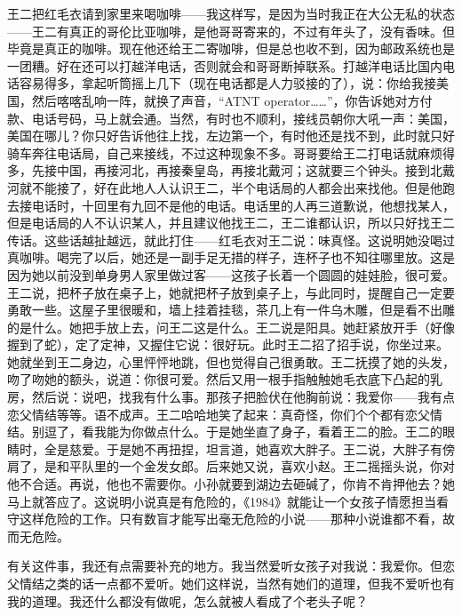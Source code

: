 王二把红毛衣请到家里来喝咖啡——我这样写，是因为当时我正在大公无私的状态——王二有真正的哥伦比亚咖啡，是他哥哥寄来的，不过有年头了，没有香味。但毕竟是真正的咖啡。现在他还给王二寄咖啡，但是总也收不到，因为邮政系统也是一团糟。好在还可以打越洋电话，否则就会和哥哥断掉联系。打越洋电话比国内电话容易得多，拿起听筒摇上几下（现在电话都是人力驳接的了），说：你给我接美国，然后喀喀乱响一阵，就换了声音，“ATNT operator……”，你告诉她对方付款、电话号码，马上就会通。当然，有时也不顺利，接线员朝你大吼一声：美国，美国在哪儿？你只好告诉他往上找，左边第一个，有时他还是找不到，此时就只好骑车奔往电话局，自己来接线，不过这种现象不多。哥哥要给王二打电话就麻烦得多，先接中国，再接河北，再接秦皇岛，再接北戴河；这就要三个钟头。接到北戴河就不能接了，好在此地人人认识王二，半个电话局的人都会出来找他。但是他跑去接电话时，十回里有九回不是他的电话。电话里的人再三道歉说，他想找某人，但是电话局的人不认识某人，并且建议他找王二，王二谁都认识，所以只好找王二传话。这些话越扯越远，就此打住——红毛衣对王二说：味真怪。这说明她没喝过真咖啡。喝完了以后，她还是一副手足无措的样子，连杯子也不知往哪里放。这是因为她以前没到单身男人家里做过客——这孩子长着一个圆圆的娃娃脸，很可爱。王二说，把杯子放在桌子上，她就把杯子放到桌子上，与此同时，提醒自己一定要勇敢一些。这屋子里很暖和，墙上挂着挂毯，茶几上有一件乌木雕，但是看不出雕的是什么。她把手放上去，问王二这是什么。王二说是阳具。她赶紧放开手（好像握到了蛇），定了定神，又握住它说：很好玩。此时王二招了招手说，你坐过来。她就坐到王二身边，心里怦怦地跳，但也觉得自己很勇敢。王二抚摸了她的头发，吻了吻她的额头，说道：你很可爱。然后又用一根手指触触她毛衣底下凸起的乳房，然后说：说吧，找我有什么事。那孩子把脸伏在他胸前说：我爱你——我有点恋父情结等等。语不成声。王二哈哈地笑了起来：真奇怪，你们个个都有恋父情结。别逗了，看我能为你做点什么。于是她坐直了身子，看着王二的脸。王二的眼睛时，全是慈爱。于是她不再扭捏，坦言道，她喜欢大胖子。王二说，大胖子有傍肩了，是和平队里的一个金发女郎。后来她又说，喜欢小赵。王二摇摇头说，你对他不合适。再说，他也不需要你。小孙就要到湖边去砸碱了，你肯不肯押他去？她马上就答应了。这说明小说真是有危险的，《1984》就能让一个女孩子情愿担当看守这样危险的工作。只有数盲才能写出毫无危险的小说——那种小说谁都不看，故而无危险。 

有关这件事，我还有点需要补充的地方。我当然爱听女孩子对我说：我爱你。但恋父情结之类的话一点都不爱听。她们这样说，当然有她们的道理，但我不爱听也有我的道理。我还什么都没有做呢，怎么就被人看成了个老头子呢？ 



